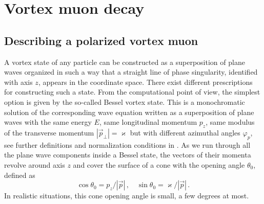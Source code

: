 \documentclass[aps,prd,longbibliography,nofootinbib,amsthm,amsmath,amssymb,amsfonts,notitlepage]{revtex4-1}
\begin{document}
\section{Vortex muon decay}\label{section-vortex-decay}

\subsection{Describing a polarized vortex muon}\label{subsection-describing}

A vortex state of any particle can be constructed as a superposition of plane waves
organized in such a way that a straight line of phase singularity, identified with axis $z$, appears in the coordinate space.
There exist different prescriptions for constructing such a state.
From the computational point of view, the simplest option is given by the so-called Bessel vortex state.
This is a monochromatic solution of the corresponding wave equation written as a superposition of plane waves
with the same energy $E$, same longitudinal momentum $p_z$, same modulus of the transverse momentum $|\vec p_\perp| = \varkappa$
but with different azimuthal angles $\varphi_p$, see further definitions and normalization conditions
in \cite{Jentschura:2010ap, Jentschura:2011ih, Ivanov:2011kk, Karlovets:2012eu}.
As we run through all the plane wave components inside a Bessel state, 
the vectors of their momenta revolve around axis $z$ and cover
the surface of a cone with the opening angle $\theta_0$, defined as
\begin{equation}
\cos\theta_0 = p_z/|\vec p|\,, \quad \sin\theta_0 = \varkappa/|\vec p|\,.\label{cone}
\end{equation}
In realistic situations, this cone opening angle is small, a few degrees at most.
\end{document}
